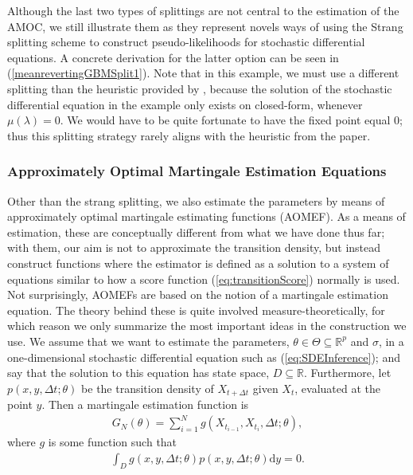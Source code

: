 Although the last two types of splittings are not central to the estimation of the AMOC, we still illustrate them as they represent novels ways of using the Strang splitting scheme to construct pseudo-likelihoods for stochastic differential equations. A concrete derivation for the latter option can be seen in (\ref{meanrevertingGBMSplit1}). Note that in this example, we must use a different splitting than the heuristic provided by \cite[section 2.3 and 2.5]{SplittingSchemes}, because the solution of the stochastic differential equation in the example only exists on closed-form, whenever $\mu(\lambda) = 0$. We would have to be quite fortunate to have the fixed point equal 0; thus this splitting strategy rarely aligns with the heuristic from the paper.
\subsubsection{Approximately Optimal Martingale Estimation Equations}\label{subsubsec:approximatelyOptimalMartingaleEstimationEquation}
Other than the strang splitting, we also estimate the parameters by means of approximately optimal martingale estimating functions (AOMEF). As a means of estimation, these are conceptually different from what we have done thus far; with them, our aim is not to approximate the transition density, but instead construct functions where the estimator is defined as a solution to a system of equations similar to how a score function (\ref{eq:transitionScore}) normally is used. Not surprisingly, AOMEFs are based on the notion of a martingale estimation equation. The theory behind these is quite involved measure-theoretically, for which reason we only summarize the most important ideas in the construction we use. We assume that we want to estimate the parameters, $\theta\in \Theta \subseteq \mathbb{R}^p$ and $\sigma$, in a one-dimensional stochastic differential equation such as (\ref{eq:SDEInference}); and say that the solution to this equation has state space, $D\subseteq \mathbb{R}$. Furthermore, let $p(x, y, \Delta t; \theta)$ be the transition density of $X_{t+\Delta t}$ given $X_t$, evaluated at the point $y$. Then a martingale estimation function is 
\begin{align}
    G_N(\theta) = \sum_{i = 1}^N g(X_{t_{i - 1}}, X_{t_i}, \Delta t; \theta), \label{eq:estimationEquation}
\end{align}
where $g$ is some function such that
\begin{align}
    \int_{D} g(x, y, \Delta t; \theta)p(x, y, \Delta t; \theta)\mathrm{d}y = 0. \label{eq:martingaleProperty}
\end{align}
